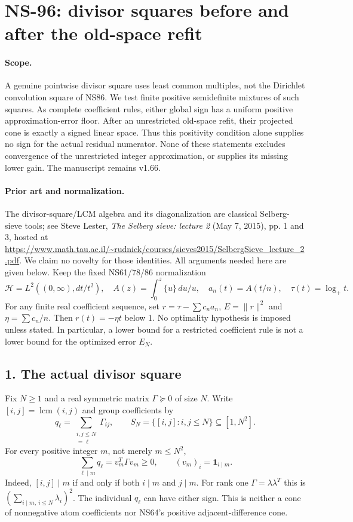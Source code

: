 \section*{NS-96: divisor squares before and after the old-space refit}

\paragraph{Scope.}
A genuine pointwise divisor square uses least common multiples, not the
Dirichlet convolution square of NS86. We test finite positive semidefinite
mixtures of such squares. As complete coefficient rules, either global sign
has a uniform positive approximation-error floor. After an unrestricted
old-space refit, their projected cone is exactly a signed linear space.
Thus this positivity condition alone supplies no sign for the actual
residual numerator. None of these statements excludes convergence of the
unrestricted integer approximation, or supplies its missing lower gain.
The manuscript remains v1.66.

\paragraph{Prior art and normalization.}
The divisor-square/LCM algebra and its diagonalization are classical
Selberg-sieve tools; see Steve Lester, \emph{The Selberg sieve: lecture 2}
(May 7, 2015), pp. 1 and 3, hosted at
\url{https://www.math.tau.ac.il/~rudnick/courses/sieves2015/SelbergSieve_lecture_2.pdf}.
We claim no novelty for those identities. All arguments needed here are
given below. Keep the fixed NS61/78/86 normalization
\[
 \mathcal H=L^2((0,\infty),dt/t^2),\quad
 A(z)=\int_0^z\{u\}\,du/u,\quad a_n(t)=A(t/n),\quad
 \tau(t)=\log_+t.
\]
For any finite real coefficient sequence, set
$r=\tau-\sum c_n a_n$, $E=\|r\|^2$ and $\eta=\sum c_n/n$.
Then $r(t)=-\eta t$ below 1. No optimality hypothesis is imposed unless
stated. In particular, a lower bound for a restricted coefficient rule is
not a lower bound for the optimized error $E_N$.

\subsection*{1. The actual divisor square}
Fix $N\geq1$ and a real symmetric matrix $\Gamma\succeq0$ of size $N$.
Write $[i,j]=\operatorname{lcm}(i,j)$ and group coefficients by
\[
 q_\ell=\sum_{\substack{i,j\leq N\\[i,j]=\ell}}\Gamma_{ij},
 \qquad S_N=\{[i,j]:i,j\leq N\}\subseteq[1,N^2].
 \tag{96.1}
\]
For every positive integer $m$, not merely $m\leq N^2$,
\[
 \sum_{\ell\mid m}q_\ell=v_m^T\Gamma v_m\geq0,
 \qquad (v_m)_i=\boldsymbol1_{i\mid m}.
 \tag{96.2}
\]
Indeed, $[i,j]\mid m$ if and only if both $i\mid m$ and $j\mid m$.
For rank one $\Gamma=\lambda\lambda^T$ this is
$(\sum_{i\mid m,\ i\leq N}\lambda_i)^2$.
The individual $q_\ell$ can have either sign. This is neither a cone of
nonnegative atom coefficients nor NS64's positive adjacent-difference cone.

